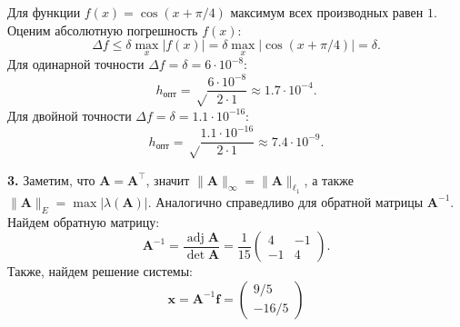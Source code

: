 \documentclass[12pt]{article}
\renewcommand{\vec}[1]{\boldsymbol{\mathbf{#1}}}
\renewcommand{\leq}{\leqslant}
\begin{document}
Для функции $f(x) = \cos(x + \pi/4)$ максимум всех производных равен $1$. Оценим абсолютную погрешность $f(x)$:
\[
\Delta f \leq \delta \max_x |f(x)| = \delta \max_x |\cos(x + \pi/4)| = \delta.
\]
Для одинарной точности $\Delta f = \delta = 6 \cdot 10^{-8}$:
\[
h_\text{опт} = \sqrt\frac{6 \cdot 10^{-8}}{2 \cdot 1} \approx 1.7 \cdot 10^{-4}.
\]
Для двойной точности $\Delta f = \delta = 1.1 \cdot 10^{-16}$:
\[
h_\text{опт} = \sqrt\frac{1.1 \cdot 10^{-16}}{2 \cdot 1} \approx 7.4 \cdot 10^{-9}.
\]

\textbf{3.} Заметим, что $\vec A = \vec A^\top$, значит $\|\vec A\|_\infty = \|\vec A\|_{\ell_1}$, а также $\|\vec A\|_E = \max |\lambda(\mathbf A)|$. Аналогично справедливо для обратной матрицы $\vec A^{-1}$. Найдем обратную матрицу:
\[
\vec A^{-1} = \frac{\operatorname{adj} \vec A}{\det \vec A} = \frac{1}{15} \begin{pmatrix}
4 & -1\\
-1 & 4
\end{pmatrix}.
\]
Также, найдем решение системы:
\[
\vec x = \vec A^{-1} \vec f = \begin{pmatrix}
9/5\\-16/5
\end{pmatrix}
\]
\end{document}
